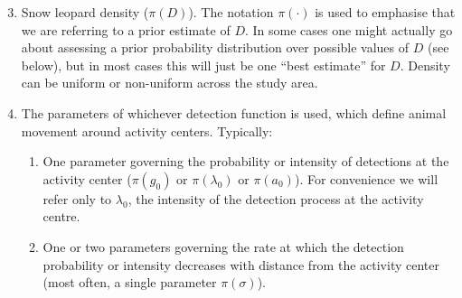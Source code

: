 \documentclass[a4paper,11pt]{article} %
\begin{document}
\begin{enumerate}
\setcounter{enumi}{2}
\item Snow leopard density ($\pi(D)$). The notation $\pi(\cdot)$ is used to emphasise that we are referring to a prior estimate of $D$. In some cases one might actually go about assessing a prior probability distribution over possible values of $D$ (see below), but in most cases this will just be one ``best estimate'' for $D$. Density can be uniform or non-uniform across the study area.
\item The parameters of whichever detection function is used, which define animal movement around activity centers. Typically:
\begin{enumerate} 
\item One parameter governing the probability or intensity of detections at the activity center ($\pi(g_0)$ or $\pi(\lambda_0)$ or $\pi(a_0)$). For convenience we will refer only to $\lambda_0$, the intensity of the detection process at the activity centre.
\item One or two parameters governing the rate at which the detection probability or intensity decreases with distance from the activity center (most often, a single parameter $\pi(\sigma)$).
\end{enumerate}
\end{enumerate}
\end{document}

